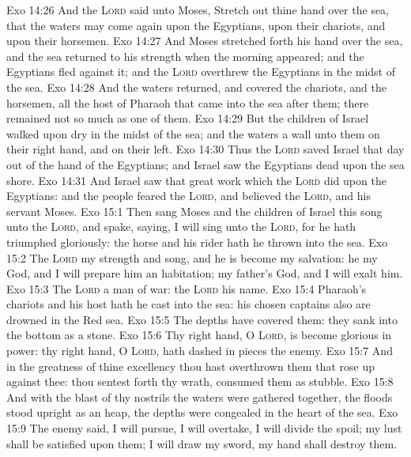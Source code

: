 \vs Exo 14:26 And the \textsc{Lord} said unto Moses, Stretch out thine hand over the sea, that the waters may come again upon the Egyptians, upon their chariots, and upon their horsemen.
\vs Exo 14:27 And Moses stretched forth his hand over the sea, and the sea returned to his strength when the morning appeared; and the Egyptians fled against it; and the \textsc{Lord} overthrew the Egyptians in the midst of the sea.
\vs Exo 14:28 And the waters returned, and covered the chariots, and the horsemen,  all the host of Pharaoh that came into the sea after them; there remained not so much as one of them.
\vs Exo 14:29 But the children of Israel walked upon dry  in the midst of the sea; and the waters  a wall unto them on their right hand, and on their left.
\vs Exo 14:30 Thus the \textsc{Lord} saved Israel that day out of the hand of the Egyptians; and Israel saw the Egyptians dead upon the sea shore.
\vs Exo 14:31 And Israel saw that great work which the \textsc{Lord} did upon the Egyptians: and the people feared the \textsc{Lord}, and believed the \textsc{Lord}, and his servant Moses.
\vs Exo 15:1 Then sang Moses and the children of Israel this song unto the \textsc{Lord}, and spake, saying, I will sing unto the \textsc{Lord}, for he hath triumphed gloriously: the horse and his rider hath he thrown into the sea.
\vs Exo 15:2 The \textsc{Lord}  my strength and song, and he is become my salvation: he  my God, and I will prepare him an habitation; my father's God, and I will exalt him.
\vs Exo 15:3 The \textsc{Lord}  a man of war: the \textsc{Lord}  his name.
\vs Exo 15:4 Pharaoh's chariots and his host hath he cast into the sea: his chosen captains also are drowned in the Red sea.
\vs Exo 15:5 The depths have covered them: they sank into the bottom as a stone.
\vs Exo 15:6 Thy right hand, O \textsc{Lord}, is become glorious in power: thy right hand, O \textsc{Lord}, hath dashed in pieces the enemy.
\vs Exo 15:7 And in the greatness of thine excellency thou hast overthrown them that rose up against thee: thou sentest forth thy wrath,  consumed them as stubble.
\vs Exo 15:8 And with the blast of thy nostrils the waters were gathered together, the floods stood upright as an heap,  the depths were congealed in the heart of the sea.
\vs Exo 15:9 The enemy said, I will pursue, I will overtake, I will divide the spoil; my lust shall be satisfied upon them; I will draw my sword, my hand shall destroy them.
